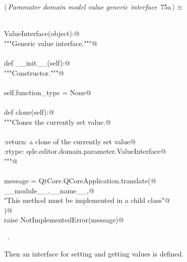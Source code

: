 \documentclass[
    a4paper,      %
    10pt,         %
    openright,    %
    notitlepage,  %
    parskip=half, %
]{scrreprt}       %
\theoremstyle{definition}                    %
\begin{document}
\begin{flushleft} \small
\begin{minipage}{\linewidth}\label{scrap120}\raggedright\small
{} $\langle\,${\itshape Paramater domain model value generic interface}\nobreak\ {\footnotesize {75a}}$\,\rangle\equiv$
\vspace{-1exm}
\begin{list}{}{} \item
\mbox{}\lstinline@@\\
\mbox{}\lstinline@class ValueInterface(object):@\\
\mbox{}\lstinline@    """Generic value interface."""@\\
\mbox{}\lstinline@@\\
\mbox{}\lstinline@    def __init__(self):@\\
\mbox{}\lstinline@        """Constructor."""@\\
\mbox{}\lstinline@@\\
\mbox{}\lstinline@        self.function_type = None@\\
\mbox{}\lstinline@@\\
\mbox{}\lstinline@    def clone(self):@\\
\mbox{}\lstinline@        """Clones the currently set value.@\\
\mbox{}\lstinline@@\\
\mbox{}\lstinline@        :return: a clone of the currently set value@\\
\mbox{}\lstinline@        :rtype:  qde.editor.domain.parameter.ValueInterface@\\
\mbox{}\lstinline@        """@\\
\mbox{}\lstinline@@\\
\mbox{}\lstinline@        message = QtCore.QCoreApplication.translate(@\\
\mbox{}\lstinline@            __module__.__name__,@\\
\mbox{}\lstinline@            "This method must be implemented in a child class"@\\
\mbox{}\lstinline@        )@\\
\mbox{}\lstinline@        raise NotImplementedError(message)@{\NWsep}
\end{list}
\vspace{-1.5ex}
\footnotesize
\begin{list}{}{\setlength{\itemsep}{-\parsep}\setlength{\itemindent}{-\leftmargin}}
\item \NWtxtMacroRefIn\ .

\item{}
\end{list}
\end{minipage}\vspace{4ex}
\end{flushleft}
Then an interface for setting and getting values is defined.
\end{document}
